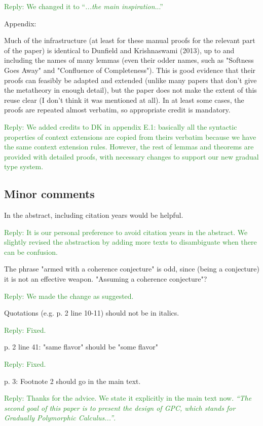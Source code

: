 \documentclass[dvipsnames]{article}
\newcommand\reply[1]{\textcolor{ForestGreen}{Reply: #1}}
\begin{document}
\reply{We changed it to ``\emph{...the main inspiration}...''}

Appendix:

Much of the infrastructure (at least for these manual proofs for the relevant
part of the paper) is identical to Dunfield and Krishnaswami (2013), up to and
including the names of many lemmas (even their odder names, such as "Softness
Goes Away" and "Confluence of Completeness"). This is good evidence that their
proofs can feasibly be adapted and extended (unlike many papers that don't give
the metatheory in enough detail), but the paper does not make the extent of this
reuse clear (I don't think it was mentioned at all). In at least some cases, the
proofs are repeated almost verbatim, so appropriate credit is mandatory.

\reply{We added credits to DK in appendix E.1: basically all the syntactic
  properties of context extensions are copied from theirs verbatim because we
  have the same context extension rules. However, the rest of lemmas and
  theorems are provided with detailed proofs, with necessary changes to
  support our new gradual type system.}


\subsection{Minor comments}

In the abstract, including citation years would be helpful.

\reply{It is our personal preference to avoid citation years in the abstract. We
  slightly revised the abstraction by adding more texts to disambiguate when
  there can be confusion.}

The phrase "armed with a coherence conjecture" is odd, since (being a
conjecture) it is not an effective weapon. "Assuming a coherence conjecture"?

\reply{We made the change as suggested.}

Quotations (e.g. p. 2 line 10-11) should not be in italics.

\reply{Fixed.}

p. 2 line 41: "same flavor" should be "some flavor"

\reply{Fixed.}

p. 3: Footnote 2 should go in the main text.

\reply{Thanks for the advice. We state it explicitly in the main text now.
  \emph{``The second goal of this paper is to present the design of GPC,
    which stands for Gradually Polymorphic Calculus...''}.}
\end{document}
